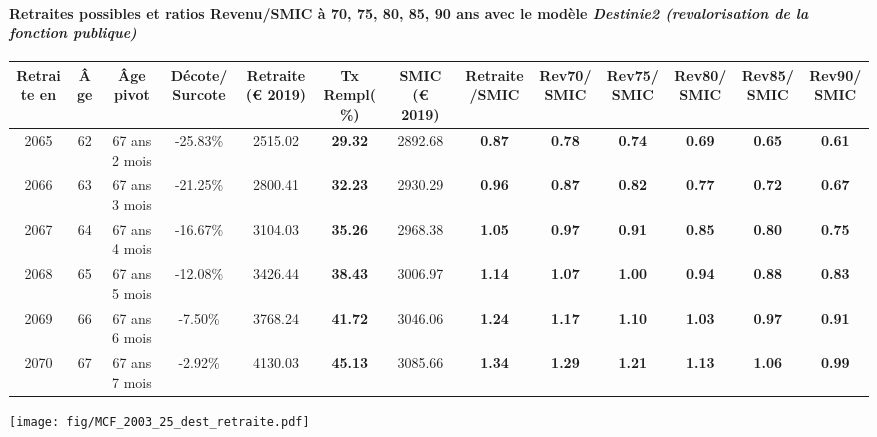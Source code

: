 \paragraph{Retraites possibles et ratios Revenu/SMIC à 70, 75, 80, 85, 90 ans avec le modèle \emph{Destinie2 (revalorisation de la fonction publique)}}  
 
{ \scriptsize \begin{center} 
\begin{tabular}[htb]{|c|c||c|c||c|c||c||c|c|c|c|c|c|} 
\hline 
 Retraite en &  Âge &  Âge pivot &  Décote/Surcote &  Retraite (\euro{} 2019) &  Tx Rempl(\%) &  SMIC (\euro{} 2019) &  Retraite/SMIC &  Rev70/SMIC &  Rev75/SMIC &  Rev80/SMIC &  Rev85/SMIC &  Rev90/SMIC \\ 
\hline \hline 
 2065 &  62 &  67 ans 2 mois &  -25.83\% &  2515.02 &  {\bf 29.32} &  2892.68 &  {\bf {\color{red} 0.87}} &  {\bf {\color{red} 0.78}} &  {\bf {\color{red} 0.74}} &  {\bf {\color{red} 0.69}} &  {\bf {\color{red} 0.65}} &  {\bf {\color{red} 0.61}} \\ 
\hline 
 2066 &  63 &  67 ans 3 mois &  -21.25\% &  2800.41 &  {\bf 32.23} &  2930.29 &  {\bf {\color{red} 0.96}} &  {\bf {\color{red} 0.87}} &  {\bf {\color{red} 0.82}} &  {\bf {\color{red} 0.77}} &  {\bf {\color{red} 0.72}} &  {\bf {\color{red} 0.67}} \\ 
\hline 
 2067 &  64 &  67 ans 4 mois &  -16.67\% &  3104.03 &  {\bf 35.26} &  2968.38 &  {\bf 1.05} &  {\bf {\color{red} 0.97}} &  {\bf {\color{red} 0.91}} &  {\bf {\color{red} 0.85}} &  {\bf {\color{red} 0.80}} &  {\bf {\color{red} 0.75}} \\ 
\hline 
 2068 &  65 &  67 ans 5 mois &  -12.08\% &  3426.44 &  {\bf 38.43} &  3006.97 &  {\bf 1.14} &  {\bf 1.07} &  {\bf 1.00} &  {\bf {\color{red} 0.94}} &  {\bf {\color{red} 0.88}} &  {\bf {\color{red} 0.83}} \\ 
\hline 
 2069 &  66 &  67 ans 6 mois &  -7.50\% &  3768.24 &  {\bf 41.72} &  3046.06 &  {\bf 1.24} &  {\bf 1.17} &  {\bf 1.10} &  {\bf 1.03} &  {\bf {\color{red} 0.97}} &  {\bf {\color{red} 0.91}} \\ 
\hline 
 2070 &  67 &  67 ans 7 mois &  -2.92\% &  4130.03 &  {\bf 45.13} &  3085.66 &  {\bf 1.34} &  {\bf 1.29} &  {\bf 1.21} &  {\bf 1.13} &  {\bf 1.06} &  {\bf {\color{red} 0.99}} \\ 
\hline 
\hline 
\end{tabular} 
\end{center} } 

 \begin{center}\texttt{[image: fig/MCF\_2003\_25\_dest\_retraite.pdf]}\end{center} \label{fig/MCF_2003_25_dest_retraite.pdf} 

